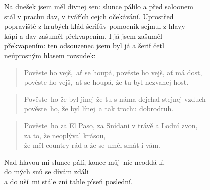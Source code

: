 \begin{song}{}
\begin{deco}
   Na dnešek jsem měl divnej sen: slunce pálilo a před saloonem \\
   stál v prachu dav, v tvářích cejch očekávání. Uprostřed \\
   popraviště z hrubých klád šerifův pomocník sejmul z hlavy \\
   kápi a dav zašuměl překvapením. I já jsem zašuměl \\
   překvapením: ten odsouzenec jsem byl já a šerif četl \\
   neúprosným hlasem rozsudek:
\end{deco}
\begin{verse}
   Pověste ho vejš,~ať se houpá, pověste ho vejš, ať má dost, \\
   pověste ho vejš,~ať se houpá, že tu byl nezvanej host.
\end{verse}
\begin{verse}
   Pověste~ho že byl jinej že tu s náma dejchal stejnej vzduch \\
   pověste~ho, že byl línej~a tak trochu dobrodruh.
\end{verse}
\begin{verse}
   Pověste~ho za El Paso, za Snídani v trávě a Lodní zvon, \\
   za to, že neoplýval krásou, \\
   že měl country rád a že se uměl smát i vám.
\end{verse}
\begin{refren}
    Nad hlavou mi slunce pálí, konec můj~nic neoddá lí, \\
    do mých snů se dívám zdáli \\
    a do uší~mi stále zní tahle píseň poslední.
\end{refren}

\chordbreak
\compactbreak


\end{song}
